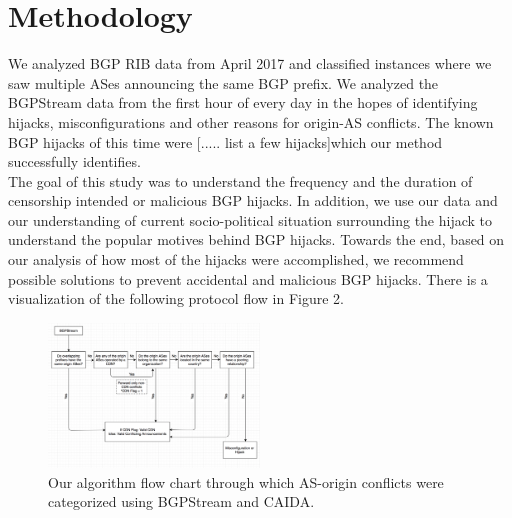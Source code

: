  \section{Methodology}\label{sec:methodology}
We analyzed BGP RIB data from April 2017 and classified instances where we saw multiple ASes announcing the same BGP prefix. We analyzed the BGPStream data from the first hour of every day in the hopes of identifying hijacks, misconfigurations and other reasons for origin-AS conflicts. The known BGP hijacks of this time were [..... list a few hijacks]which our method successfully  identifies. \\
The goal of this study was to understand the frequency and the duration of censorship intended or malicious BGP hijacks. In addition, we  use our data and our understanding of current socio-political situation surrounding the hijack to understand the popular motives behind BGP hijacks. Towards the end, based on our analysis of how most of the hijacks were accomplished, we recommend possible solutions to prevent accidental and malicious BGP hijacks. 
There is a visualization of the following protocol flow in Figure 2.

 \begin{figure}[!htbp]
	\includegraphics[width=0.5\textwidth]{flow.png}
	\caption{Our algorithm flow chart through which AS-origin conflicts were categorized using BGPStream and CAIDA.}
	\label{a:label}
\end{figure}

